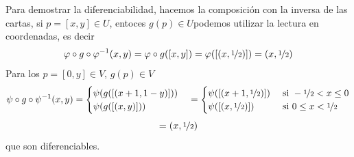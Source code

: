 \begin{ejer}
\begin{enumerate}
\begin{sol}
            Para demostrar la diferenciabilidad, hacemos la composici\'on con la inversa de las cartas, si $p=[x,y] \in U$, entoces $g(p)\in U $podemos utilizar la lectura en coordenadas, es decir
            $$\varphi \circ g \circ \varphi^{-1}(x,y) = \varphi\circ g([x,y]) = \varphi([(x,\nicefrac{1}{2})])=(x,\nicefrac{1}{2})$$
            Para los $p=[0,y] \in V$, $g(p) \in V$
            $$\psi \circ g \circ \psi^{-1}(x,y) = \begin{cases}
                \psi (g([(x+1,1-y)]))  \\ 
                \psi (g([(x,y)]))     
            \end{cases} = \begin{cases}
                \psi([(x+1,\nicefrac{1}{2})])  &  \text{ si }-\nicefrac{1}{2}< x \leq 0   \\ 
                \psi([(x,\nicefrac{1}{2})])     & \text{ si }0\leq x< \nicefrac{1}{2} 
            \end{cases} $$
            $$=(x,\nicefrac{1}{2})$$
            que son diferenciables.
        \end{sol}
    \end{enumerate}
\end{ejer}
